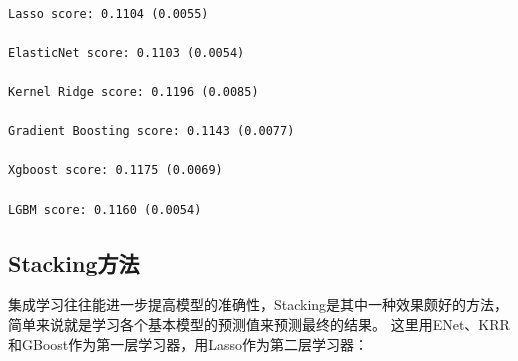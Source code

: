 \documentclass[no-math]{YangThesis}
\begin{document}
\begin{Verbatim}[commandchars=\\\{\}]

Lasso score: 0.1104 (0.0055)

ElasticNet score: 0.1103 (0.0054)

Kernel Ridge score: 0.1196 (0.0085)

Gradient Boosting score: 0.1143 (0.0077)

Xgboost score: 0.1175 (0.0069)

LGBM score: 0.1160 (0.0054)

\end{Verbatim}

\hypertarget{stackingux65b9ux6cd5}{%
	\subsection{Stacking方法}\label{stackingux65b9ux6cd5}}

集成学习往往能进一步提高模型的准确性，Stacking是其中一种效果颇好的方法，简单来说就是学习各个基本模型的预测值来预测最终的结果。
这里用ENet、KRR和GBoost作为第一层学习器，用Lasso作为第二层学习器：
\end{document}

